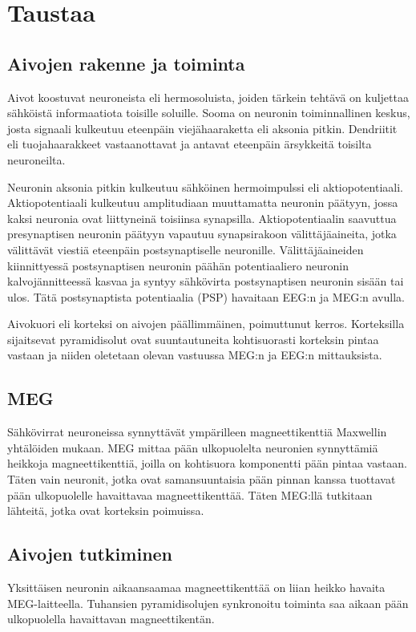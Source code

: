 \section{Taustaa}

\subsection{Aivojen rakenne ja toiminta}
Aivot koostuvat neuroneista eli hermosoluista, joiden tärkein tehtävä on kuljettaa sähköistä informaatiota toisille soluille. Sooma on neuronin toiminnallinen keskus, josta signaali kulkeutuu eteenpäin viejähaaraketta eli aksonia pitkin. Dendriitit eli tuojahaarakkeet vastaanottavat ja antavat eteenpäin ärsykkeitä toisilta neuroneilta. \citep{Hamalainen1993MagnetoencephalographytheoryBrain}

Neuronin aksonia pitkin kulkeutuu sähköinen hermoimpulssi eli aktiopotentiaali. Aktiopotentiaali kulkeutuu amplitudiaan muuttamatta neuronin päätyyn, jossa kaksi neuronia ovat liittyneinä toisiinsa synapsilla. Aktiopotentiaalin saavuttua presynaptisen neuronin päätyyn vapautuu synapsirakoon välittäjäaineita, jotka välittävät viestiä eteenpäin postsynaptiselle neuronille. Välittäjäaineiden kiinnittyessä postsynaptisen neuronin päähän potentiaaliero neuronin kalvojännitteessä kasvaa ja syntyy sähkövirta postsynaptisen neuronin sisään tai ulos. Tätä postsynaptista potentiaalia (PSP) havaitaan EEG:n ja MEG:n avulla. \citep{Hamalainen1993MagnetoencephalographytheoryBrain}

Aivokuori eli korteksi on aivojen päällimmäinen, poimuttunut kerros. Korteksilla sijaitsevat pyramidisolut ovat suuntautuneita kohtisuorasti korteksin pintaa vastaan ja niiden oletetaan olevan vastuussa MEG:n ja EEG:n mittauksista. \citep{Hamalainen1993MagnetoencephalographytheoryBrain}

\subsection{MEG}
Sähkövirrat neuroneissa synnyttävät ympärilleen magneettikenttiä Maxwellin yhtälöiden mukaan. MEG mittaa pään ulkopuolelta neuronien synnyttämiä heikkoja magneettikenttiä, joilla on kohtisuora komponentti pään pintaa vastaan. Täten vain neuronit, jotka ovat samansuuntaisia pään pinnan kanssa tuottavat pään ulkopuolelle havaittavaa magneettikenttää. Täten MEG:llä tutkitaan lähteitä, jotka ovat korteksin poimuissa. \citep[s. 5]{hansen2010meg}

\subsection{Aivojen tutkiminen}
Yksittäisen neuronin  aikaansaamaa magneettikenttää on liian heikko havaita MEG-laitteella. Tuhansien pyramidisolujen synkronoitu toiminta saa aikaan pään ulkopuolella havaittavan magneettikentän.

